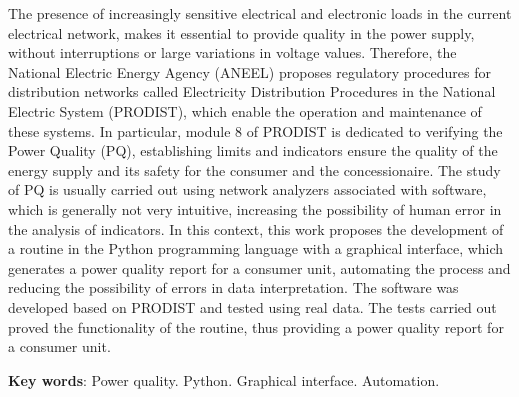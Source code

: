 \begin{resumo}[ABSTRACT]
  \begin{SingleSpacing}
    The presence of increasingly sensitive electrical and electronic loads in the current electrical network, makes it essential to provide quality in the power supply, without interruptions or large variations in voltage values. Therefore, the National Electric Energy Agency (ANEEL) proposes regulatory procedures for distribution networks called Electricity Distribution Procedures in the National Electric System (PRODIST), which enable the operation and maintenance of these systems. In particular, module 8 of PRODIST is dedicated to verifying the Power Quality (PQ), establishing limits and indicators ensure the quality of the energy supply and its safety for the consumer and the concessionaire. The study of PQ is usually carried out using network analyzers associated with software, which is generally not very intuitive, increasing the possibility of human error in the analysis of indicators. In this context, this work proposes the development of a routine in the Python programming language with a graphical interface, which generates a power quality report for a consumer unit, automating the process and reducing the possibility of errors in data interpretation. The software was developed based on PRODIST and tested using real data. The tests carried out proved the functionality of the routine, thus providing a power quality report for a consumer unit.
  \end{SingleSpacing}

  \vspace{\onelineskip}
  \textbf{Key words}: Power quality. Python. Graphical interface. Automation.
\end{resumo}